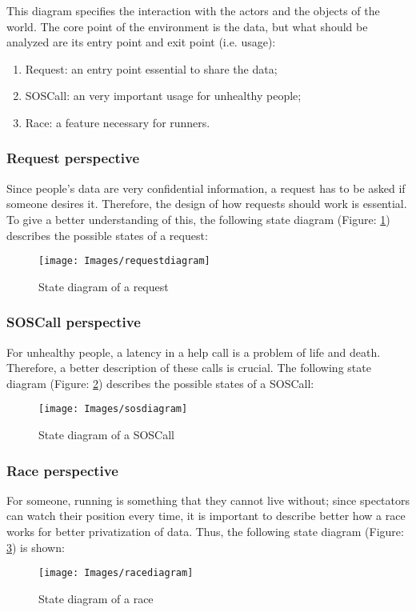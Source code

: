 This diagram specifies the interaction with the actors and the objects of the world. The core point of 
the environment is the data, but what should be analyzed are its entry point and exit point (i.e. usage):

\begin{enumerate}
\item Request: an entry point essential to share the data;
\item SOSCall: an very important usage for unhealthy people;
\item Race: a feature necessary for runners.
\end{enumerate}

\subsubsection{Request perspective}
Since people's data are very confidential information, a request has to be asked if someone desires it. 
Therefore, the design of how requests should work is essential. To give a better understanding of this, 
the following state diagram (Figure: \ref{fig:requestdiagram})  describes the possible states of a request:

\begin{figure}[H]
\texttt{[image: Images/requestdiagram]}
\caption{State diagram of a request}
\label{fig:requestdiagram}
\end{figure}

\subsubsection{SOSCall perspective}
For unhealthy people, a latency in a help call is a problem of life and death. Therefore, a better 
description of these calls is crucial. The following state diagram (Figure: \ref{fig:sosdiagram}) 
describes the possible states of a SOSCall:

\begin{figure}[H]
\texttt{[image: Images/sosdiagram]}
\caption{State diagram of a SOSCall}
\label{fig:sosdiagram}
\end{figure}

\subsubsection{Race perspective}
For someone, running is something that they cannot live without; since spectators can watch their 
position every time, it is important to describe better how a race works for better privatization of 
data. Thus, the following state diagram (Figure: \ref{fig:racediagram}) is shown: 

\begin{figure}[H]
\texttt{[image: Images/racediagram]}
\caption{State diagram of a race}
\label{fig:racediagram}
\end{figure}
